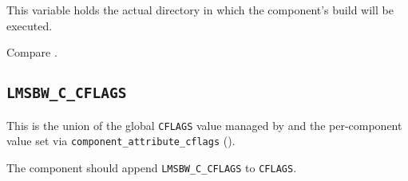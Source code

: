 This variable holds the actual directory in which the component's
build will be executed.

Compare .

\subsection{\texttt{LMSBW\_C\_CFLAGS}}

This is the union of the global \texttt{CFLAGS} value managed by
\lmsbw and the per-component value set via
\texttt{\texttt{component\_attribute\_cflags}} ().

The component \makefile should append \texttt{LMSBW\_C\_CFLAGS} to
\texttt{CFLAGS}.

